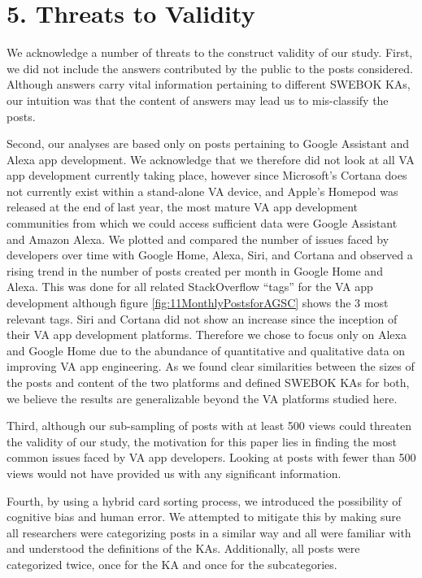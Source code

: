 \documentclass{sigchi}
\begin{document}
\section{5. Threats to Validity}
We acknowledge a number of threats to the construct validity of our study. First, we did not include the answers contributed by the public to the posts considered. Although answers carry vital information pertaining to different SWEBOK KAs, our intuition was that the content of answers may lead us to mis-classify the posts. 

Second, our analyses are based only on posts pertaining to Google Assistant and Alexa app development. We acknowledge that we therefore did not look at all VA app development currently taking place, however since Microsoft's Cortana does not currently exist within a stand-alone VA device, and Apple's Homepod was released at the end of last year, the most mature VA app development communities from which we could access sufficient data were Google Assistant and Amazon Alexa. We plotted and compared the number of issues faced by developers over time with Google Home, Alexa, Siri, and Cortana and observed a rising trend in the number of posts created per month in Google Home and Alexa. This was done for all related StackOverflow ``tags'' for the VA app development although figure \ref{fig:11MonthlyPostsforAGSC} shows the 3 most relevant tags. Siri and Cortana did not show an increase since the inception of their VA app development platforms. Therefore we chose to focus only on Alexa and Google Home due to the abundance of quantitative and qualitative data on improving VA app engineering. As we found clear similarities between the sizes of the posts and content of the two platforms and defined SWEBOK KAs for both, we believe the results are generalizable beyond the VA platforms studied here.  

Third, although our sub-sampling of posts with at least 500 views could threaten the validity of our study, the motivation for this paper lies in finding the most common issues faced by VA app developers. Looking at posts with fewer than 500 views would not have provided us with any significant information. 

Fourth, by using a hybrid card sorting process, we introduced the possibility of cognitive bias and human error. We attempted to mitigate this by making sure all researchers were categorizing posts in a similar way and all were familiar with and understood the definitions of the KAs. Additionally, all posts were categorized twice, once for the KA and once for the subcategories. 
\end{document}
